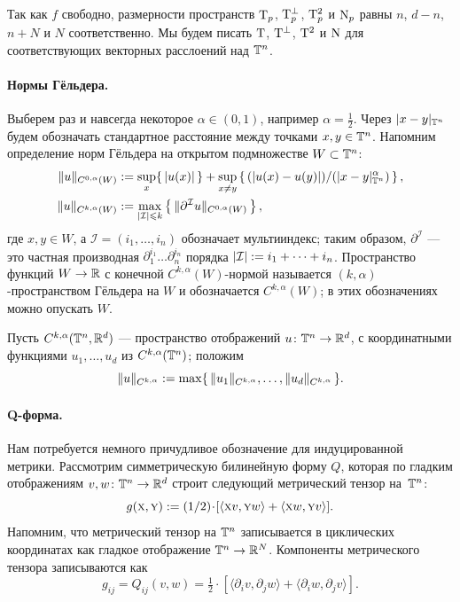Так как $f$ свободно, размерности пространств $\mathrm{T}_p$, $\mathrm{T}_p^\perp$, $\mathrm{T}^2_p$ и $\operatorname{\rm N}_p$ равны $n$, $d - n$, $n + N$ и $N$ соответственно.
Мы будем писать $\mathrm{T}$, $\mathrm{T}^\perp$, $\mathrm{T}^2$ и $\operatorname{\rm N}$ для соответствующих векторных расслоений над $\mathbb{T}^n$.
\label{TTTN}

\paragraph{Нормы Гёльдера.}
Выберем раз и навсегда некоторое $\alpha\in(0,1)$, например $\alpha=\tfrac12$.
Через $|x-y|_{\mathbb{T}^n}$ будем обозначать стандартное расстояние между точками $x,y\z\in\TT^n$.
Напомним определение норм Гёльдера на открытом подмножестве $W\subset \mathbb{T}^n$: \label{C(T)}
\begin{align*}
\|u\|_{C^{0,\alpha}(W)}
&\mathrel{:=}\sup_{x}\{\,|u(x)|\,\}
+\sup_{x\ne y}\left\{\,(|u(x)-u(y)|)/(|x-y|_{\mathbb{T}^n}^\alpha)\,\right\},
\\
\|u\|_{C^{k,\alpha}(W)}&\mathrel{:=}\max_{|\mathcal{I}|\leqslant k}\left\{\,\|\partial^{\mathcal{I}}u\|_{C^{0,\alpha}(W)}\,\right\},
\end{align*}
где $x,y\in W$, а $\mathcal{I} = (i_1,\dots,i_n)$ обозначает мультииндекс; таким образом, $\partial^{\mathcal{I}}$ --- это частная производная $\partial_1^{i_1}\dots\partial_n^{i_n}$ порядка $|\mathcal{I}| \z\df i_1 +\dots+i_n$.
Пространство функций $W\to \mathbb{R}$ с конечной ${C^{k,\alpha}(W)}$-нормой называется $(k,\alpha)$-пространством Гёльдера на $W$ и обозначается $C^{k,\alpha}(W)$;  в этих обозначениях можно опускать $W$.

Пусть $C^{k,\alpha}(\mathbb{T}^n,\mathbb{R}^d)$ --- пространство отображений $u\colon\TT^n\z\to \RR^d$, с координатными функциями $u_1,\dots, u_d$ из $C^{k,\alpha}(\mathbb{T}^n)$;
положим
\[\|u\|_{C^{k,\alpha}}\mathrel{:=}\max \{\,\|u_1\|_{C^{k,\alpha}},\dots,\|u_d\|_{C^{k,\alpha}} \,\}.\]

\paragraph{Q-форма.}
Нам потребуется немного причудливое обозначение для индуцированной метрики.
Рассмотрим симметрическую билинейную форму $Q$\label{Q}, которая по гладким отображениям $v, w\colon\TT^n \z\to \RR^d$ строит следующий метрический тензор на~$\mathbb{T}^n$:
\[
g(\vec x, \vec y)
\df
\tfrac{1}{2} \cdot [\langle \vec x v, \vec y w \rangle + \langle \vec x w, \vec y v \rangle].
\]
Напомним, что метрический тензор на $\mathbb{T}^n$ записывается в циклических координатах как гладкое отображение $\mathbb{T}^n\to\mathbb{R}^N$.
Компоненты метрического тензора записываются как
\[
g_{ij} = Q_{ij}(v, w) = \tfrac{1}{2} \cdot [\langle \partial_i v, \partial_j w \rangle+\langle \partial_i w, \partial_j v \rangle].
\]

